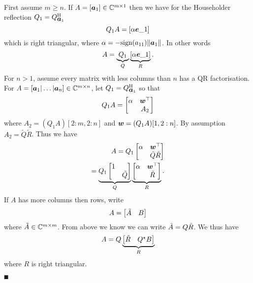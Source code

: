 First assume $m \ensuremath{\geq} n$. If $A = [\bm{{\mbox{\boldmath$a$\unboldmath}}}_1] \in {\mathbb C}^{m \times 1}$ then we have for the Householder reflection $Q_1 = Q_{\bm{{\mbox{\boldmath$a$\unboldmath}}}_1}^{\rm H}$
\[
Q_1 A = [\alpha \bm{{\mbox{\boldmath$e$\unboldmath}}}\_1]
\]
which is right triangular, where $\alpha = -{\rm sign}(a_{11}) \|\bm{{\mbox{\boldmath$a$\unboldmath}}}_1\|$.  In other words 
\[
A = \underbrace{Q_1}_Q \underbrace{[\alpha \bm{{\mbox{\boldmath$e$\unboldmath}}}\_1]}_R.
\]
For $n > 1$, assume every matrix with less columns than $n$ has a QR factorisation. For $A = [\bm{{\mbox{\boldmath$a$\unboldmath}}}_1|\ldots|\bm{{\mbox{\boldmath$a$\unboldmath}}}_n] \in {\mathbb C}^{m \times n}$, let $Q_1 = Q_{\bm{{\mbox{\boldmath$a$\unboldmath}}}_1}^{\rm H}$ so that
\[
Q_1 A =  \begin{bmatrix} \alpha & \bm{{\mbox{\boldmath$w$\unboldmath}}}^\top \\ & A_2 \end{bmatrix}
\]
where $A_2 = (Q_1 A)[2:m,2:n]$ and $\bm{{\mbox{\boldmath$w$\unboldmath}}} = (Q_1 A)[1,2:n]$. By assumption $A_2 = \tilde Q \tilde R$. Thus we have
\begin{align*}
A = Q_1 \begin{bmatrix} \alpha & \bm{{\mbox{\boldmath$w$\unboldmath}}}^\top \\ & \tilde Q \tilde R \end{bmatrix} \\
=\underbrace{Q_1 \begin{bmatrix} 1 \\ & \tilde Q \end{bmatrix}}_Q  \underbrace{\begin{bmatrix} \alpha & \bm{{\mbox{\boldmath$w$\unboldmath}}}^\top \\ &  \tilde R \end{bmatrix}}_R.
\end{align*}
If $A$ has more columns then rows, write 
\[
A = \begin{bmatrix} \tilde A & B \end{bmatrix}
\]
where $\tilde A \in {\mathbb C}^{m \times m}$. From above we know we can write $\tilde A = Q \tilde R$. We thus have
\[
A = Q \underbrace{\begin{bmatrix} \tilde R & Q^\star B \end{bmatrix}}_R
\]
where $R$ is right triangular.

\ensuremath{\QED}

